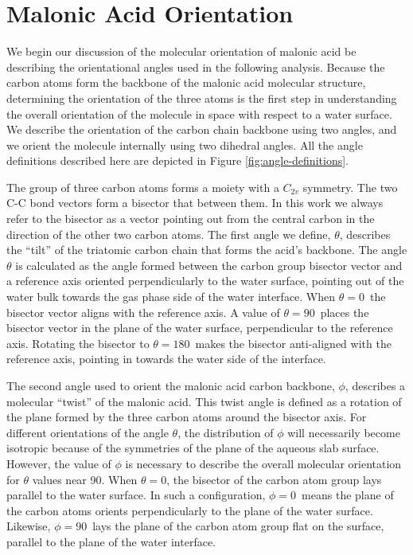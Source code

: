 \section{Malonic Acid Orientation}

We begin our discussion of the molecular orientation of malonic acid be describing the orientational angles used in the following analysis.  Because the carbon atoms form the backbone of the malonic acid molecular structure, determining the orientation of the three atoms is the first step in understanding the overall orientation of the molecule in space with respect to a water surface.  We describe the orientation of the carbon chain backbone using two angles, and we orient the molecule internally using two dihedral angles.  All the angle definitions described here are depicted in Figure \ref{fig:angle-definitions}. 

The group of three carbon atoms forms a moiety with a $C_{2v}$ symmetry.  The two C-C bond vectors form a bisector that between them.  In this work we always refer to the bisector as a vector pointing out from the central carbon in the direction of the other two carbon atoms.  The first angle we define, $\theta$, describes the ``tilt'' of the triatomic carbon chain that forms the acid's backbone. The angle $\theta$ is calculated as the angle formed between the carbon group bisector vector and a reference axis oriented perpendicularly to the water surface, pointing out of the water bulk towards the gas phase side of the water interface. When $\theta = 0$\textdegree~the bisector vector aligns with the reference axis. A value of $\theta=90$\textdegree~places the bisector vector in the plane of the water surface, perpendicular to the reference axis. Rotating the bisector to $\theta=180$\textdegree~makes the bisector anti-aligned with the reference axis, pointing in towards the water side of the interface.

The second angle used to orient the malonic acid carbon backbone, $\phi$, describes a molecular ``twist'' of the malonic acid. This twist angle is defined as a rotation of the plane formed by the three carbon atoms around the bisector axis. For different orientations of the angle $\theta$, the distribution of $\phi$ will necessarily become isotropic because of the symmetries of the plane of the aqueous slab surface. However, the value of $\phi$ is necessary to describe the overall molecular orientation for $\theta$ values near 90\textdegree. When $\theta = 0$\textdegree, the bisector of the carbon atom group lays parallel to the water surface. In such a configuration, $\phi = 0$\textdegree~means the plane of the carbon atoms orients perpendicularly to the plane of the water surface. Likewise, $\phi=90$\textdegree~lays the plane of the carbon atom group flat on the surface, parallel to the plane of the water interface.

